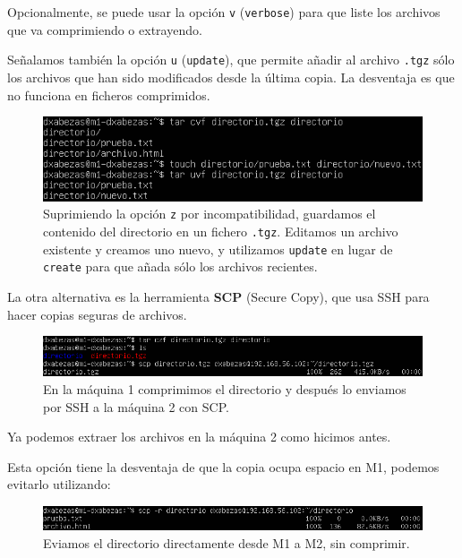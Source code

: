 \documentclass{article}
\begin{document}
Opcionalmente, se puede usar la opción \texttt{v} (\texttt{verbose}) para que liste los archivos que va comprimiendo o extrayendo.

Señalamos también la opción \texttt{u} (\texttt{update}), que permite añadir al archivo \texttt{.tgz} sólo los archivos que han sido
 modificados desde la última copia. La desventaja es que no funciona en ficheros comprimidos.

\begin{figure}[H]
	\centering
	\includegraphics[width=140mm]{imgs/tar-update}
	\caption{Suprimiendo la opción \texttt{z} por incompatibilidad, guardamos el contenido del directorio en un fichero \texttt{.tgz}.
	Editamos un archivo existente y creamos uno nuevo, y utilizamos \texttt{update} en lugar de \texttt{create} para que añada sólo los
	archivos recientes.}
	\label{fig:tar-update}
\end{figure}

La otra alternativa es la herramienta \textbf{SCP} (Secure Copy), que usa SSH para hacer copias seguras de archivos.

\begin{figure}[H]
	\centering
	\includegraphics[width=160mm]{imgs/scp}
	\caption{En la máquina 1 comprimimos el directorio y después lo enviamos por SSH a la máquina 2 con SCP.}
	\label{fig:scp}
\end{figure}

Ya podemos extraer los archivos en la máquina 2 como hicimos antes.

Esta opción tiene la desventaja de que la copia ocupa espacio en M1, podemos evitarlo utilizando:

\begin{figure}[H]
	\centering
	\includegraphics[width=160mm]{imgs/scp2}
	\caption{Eviamos el directorio directamente desde M1 a M2, sin comprimir.}
	\label{fig:scp2}
\end{figure}
\end{document}
